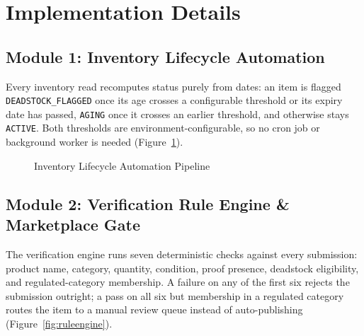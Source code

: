\documentclass[11pt,a4paper]{report}
\begin{document}
\section{Implementation Details}

\subsection{Module 1: Inventory Lifecycle Automation}
Every inventory read recomputes status purely from dates: an item is
flagged \texttt{DEADSTOCK\_FLAGGED} once its age crosses a configurable
threshold or its expiry date has passed, \texttt{AGING} once it crosses an
earlier threshold, and otherwise stays \texttt{ACTIVE}. Both thresholds are
environment-configurable, so no cron job or background worker is needed
(Figure~\ref{fig:lifecycle}).

\begin{figure}[h]
\centering
{}
\caption{Inventory Lifecycle Automation Pipeline}
\label{fig:lifecycle}
\end{figure}

\subsection{Module 2: Verification Rule Engine \& Marketplace Gate}
The verification engine runs seven deterministic checks against every
submission: product name, category, quantity, condition, proof presence,
deadstock eligibility, and regulated-category membership. A failure on any
of the first six rejects the submission outright; a pass on all six but
membership in a regulated category routes the item to a manual review queue
instead of auto-publishing (Figure~\ref{fig:ruleengine}).
\end{document}
